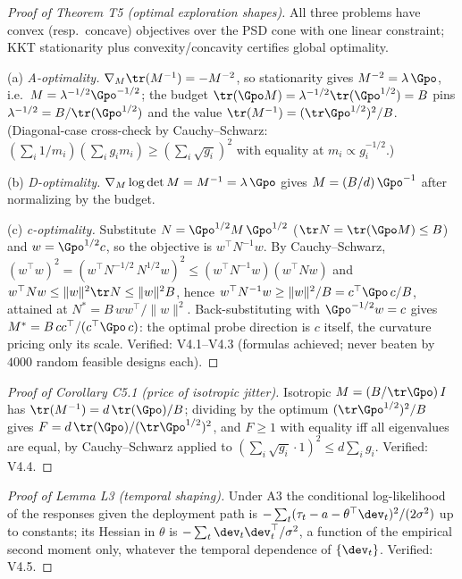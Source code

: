 \begin{proof}[Proof of Theorem T5 (optimal exploration shapes)]
All three problems have convex (resp.\ concave) objectives over the PSD
cone with one linear constraint; KKT stationarity plus
convexity/concavity certifies global optimality.

(a) \emph{A-optimality.} $\nabla_M \tr(M^{-1}) = -M^{-2}$, so stationarity
gives $M^{-2} = \lambda\,\Gpo$, i.e.\ $M = \lambda^{-1/2}\Gpo^{-1/2}$;
the budget $\tr(\Gpo M) = \lambda^{-1/2}\tr(\Gpo^{1/2}) = B$ pins
$\lambda^{-1/2} = B/\tr(\Gpo^{1/2})$ and the value
$\tr(M^{-1}) = (\tr \Gpo^{1/2})^2/B$. (Diagonal-case cross-check by
Cauchy--Schwarz: $(\sum_i 1/m_i)(\sum_i g_i m_i) \ge (\sum_i \sqrt{g_i})^2$
with equality at $m_i \propto g_i^{-1/2}$.)

(b) \emph{D-optimality.} $\nabla_M \log\det M = M^{-1} = \lambda\,\Gpo$
gives $M = (B/d)\,\Gpo^{-1}$ after normalizing by the budget.

(c) \emph{c-optimality.} Substitute $N = \Gpo^{1/2} M\,\Gpo^{1/2}$
($\tr N = \tr(\Gpo M) \le B$) and $w = \Gpo^{1/2} c$, so the objective is
$w^\top N^{-1} w$. By Cauchy--Schwarz,
$(w^\top w)^2 = (w^\top N^{-1/2}\,N^{1/2} w)^2
\le (w^\top N^{-1} w)(w^\top N w)$ and $w^\top N w \le \|w\|^2 \tr N \le
\|w\|^2 B$, hence $w^\top N^{-1} w \ge \|w\|^2/B = c^\top \Gpo\,c/B$,
attained at $N^* = B\,ww^\top/\|w\|^2$. Back-substituting with
$\Gpo^{-1/2}w = c$ gives $M^* = B\,cc^\top/(c^\top\Gpo\,c)$: the optimal
probe direction is $c$ itself, the curvature pricing only its scale.
Verified: V4.1--V4.3 (formulas achieved; never beaten by $4000$ random
feasible designs each).
\end{proof}

\begin{proof}[Proof of Corollary C5.1 (price of isotropic jitter)]
Isotropic $M = (B/\tr\Gpo)\,I$ has $\tr(M^{-1}) = d\,\tr(\Gpo)/B$; dividing
by the optimum $(\tr\Gpo^{1/2})^2/B$ gives
$F = d\,\tr(\Gpo)/(\tr\Gpo^{1/2})^2$, and $F \ge 1$ with equality iff all
eigenvalues are equal, by Cauchy--Schwarz applied to
$(\sum_i \sqrt{g_i}\cdot 1)^2 \le d \sum_i g_i$. Verified: V4.4.
\end{proof}

\begin{proof}[Proof of Lemma L3 (temporal shaping)]
Under A3 the conditional log-likelihood of the responses given the
deployment path is $-\sum_t (\tau_t - a - \theta^\top \dev_t)^2/(2\sigma^2)$
up to constants; its Hessian in $\theta$ is $-\sum_t \dev_t
\dev_t^\top/\sigma^2$, a function of the empirical second moment only,
whatever the temporal dependence of $\{\dev_t\}$. Verified: V4.5.
\end{proof}

